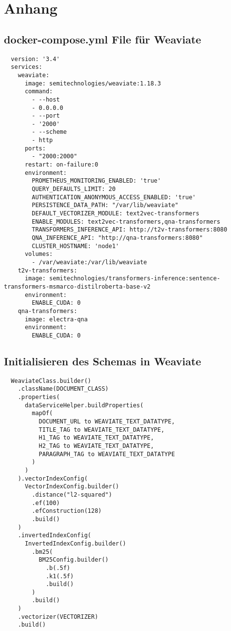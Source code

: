 \chapter{Anhang}
\label{chap:appendix}

\section{docker-compose.yml File für Weaviate}
\begin{verbatim}
  version: '3.4'
  services:
    weaviate:
      image: semitechnologies/weaviate:1.18.3
      command:
        - --host
        - 0.0.0.0
        - --port
        - '2000'
        - --scheme
        - http
      ports:
        - "2000:2000"
      restart: on-failure:0
      environment:
        PROMETHEUS_MONITORING_ENABLED: 'true'
        QUERY_DEFAULTS_LIMIT: 20
        AUTHENTICATION_ANONYMOUS_ACCESS_ENABLED: 'true'
        PERSISTENCE_DATA_PATH: "/var/lib/weaviate"
        DEFAULT_VECTORIZER_MODULE: text2vec-transformers
        ENABLE_MODULES: text2vec-transformers,qna-transformers
        TRANSFORMERS_INFERENCE_API: http://t2v-transformers:8080
        QNA_INFERENCE_API: "http://qna-transformers:8080"
        CLUSTER_HOSTNAME: 'node1'
      volumes:
        - /var/weaviate:/var/lib/weaviate
    t2v-transformers:
      image: semitechnologies/transformers-inference:sentence-transformers-msmarco-distilroberta-base-v2
      environment:
        ENABLE_CUDA: 0
    qna-transformers:
      image: electra-qna
      environment:
        ENABLE_CUDA: 0  
\end{verbatim}

\section{Initialisieren des Schemas in Weaviate}
\begin{verbatim}
  WeaviateClass.builder()
    .className(DOCUMENT_CLASS)
    .properties(
      dataServiceHelper.buildProperties(
        mapOf(
          DOCUMENT_URL to WEAVIATE_TEXT_DATATYPE,
          TITLE_TAG to WEAVIATE_TEXT_DATATYPE,
          H1_TAG to WEAVIATE_TEXT_DATATYPE,
          H2_TAG to WEAVIATE_TEXT_DATATYPE,
          PARAGRAPH_TAG to WEAVIATE_TEXT_DATATYPE
        )
      )
    ).vectorIndexConfig(
      VectorIndexConfig.builder()
        .distance("l2-squared")
        .ef(100)
        .efConstruction(128)
        .build()
    )
    .invertedIndexConfig(
      InvertedIndexConfig.builder()
        .bm25(
          BM25Config.builder()
            .b(.5f)
            .k1(.5f)
            .build()
        )
        .build()
    )
    .vectorizer(VECTORIZER)
    .build()
\end{verbatim}